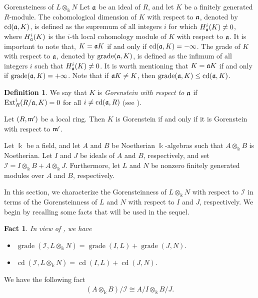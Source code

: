 \documentclass[10pt,a4paper]{amsart}
\makeatletter
\numberwithin{equation}{theorem}
\theoremstyle{definition}
\newtheorem{definition}[theorem]{Definition}
\theoremstyle{fact}
\newtheorem{fact}[theorem]{Fact}
\theoremstyle{conjecture}
\newcommand{\grade}{\operatorname{grade}}
\newcommand{\cd}{\operatorname{cd}}
\newcommand{\Ext}{\operatorname{Ext}}
\newcommand{\fm}{\frak{m}}
\newcommand{\fa}{\frak{a}}
\def\section{\@startsection{section}{1}%
\z@{.7\linespacing\@plus\linespacing}{.5\linespacing}%
{\normalfont\Large\bfseries\filcenter}}
\makeatother
\begin{document}
\section{Gorensteiness of $L\otimes_{\Bbbk} N$}
Let $\fa$ be an ideal of $R$, and let $K$ be a finitely generated $R$-module.
 The cohomological dimension of $K$ with respect to $\fa$, denoted by $\cd(\fa, K)$, is defined as the supremum of
all integers $i$ for which $H^i_\fa(K)\neq 0$, where $H^i_\fa(K)$ is the $i$-th local cohomology module of $K$ with respect to $\fa$.
 It is important to note that, $K=\fa K$ if and only if $\cd(\fa, K)=-\infty$.  The grade of $K$ with respect to $\fa$, denoted by $\grade(\fa, K)$,
 is defined as the infimum of all integers $i$ such that $H^i_\fa(K)\neq 0$.
 It is worth mentioning that $K=\fa K$ if and only if $\grade(\fa, K)=+\infty$. Note that if $\fa K\neq K$, then $\grade(\fa, K)\leq \cd(\fa, K)$.
\begin{definition}
\label{2.1}
We say that $K$ is \emph{Gorenstein with respect to $\fa$} if $\Ext_R^i(R/\fa, K)=0$ for all $i\neq \cd(\fa,R)$ (see \cite{PDR}).
\end{definition}
Let $(R,\fm')$ be a local ring. Then $K$ is Gorenstein if and only if it is Gorenstein with respect to $\fm'$.

Let $\Bbbk$ be a field, and let $A$ and $B$ be Noetherian $\Bbbk$-algebras such that $A\otimes_{\Bbbk} B$ is Noetherian. Let $I$ and $J$ be ideals of $A$ and $B$, respectively, and set
$
\mathcal{I}=I\otimes_{\Bbbk} B+A\otimes_{\Bbbk} J.
$
Furthermore, let $L$ and $N$ be nonzero finitely generated modules over $A$ and $B$, respectively.

In this section, we characterize the Gorensteinness of $L\otimes_{\Bbbk} N$ with respect to $\mathcal{I}$ in terms of the Gorensteinness of $L$ and $N$ with respect to $I$ and $J$, respectively.
We begin by recalling some facts that will be used in the sequel.

 \begin{fact}{\em
\label{2.2}
In view of \cite[Theorem 2.6]{R4}, we have
\begin{itemize}
\item[{(a)}] $\grade(\mathcal{I}, L\otimes_{\Bbbk} N)=\grade(I, L)+\grade(J, N)$.
\item[{(b)}] $\cd(\mathcal{I}, L\otimes_{\Bbbk} N)=\cd(I, L)+\cd(J, N)$.
\end{itemize}
 }
\end{fact}

We have the following fact
 \begin{eqnarray}	
\label{2.2.1}
(A\otimes_{\Bbbk} B)/\mathcal{I}\cong A/I\otimes_\Bbbk B/J.
\end{eqnarray}
\end{document}
